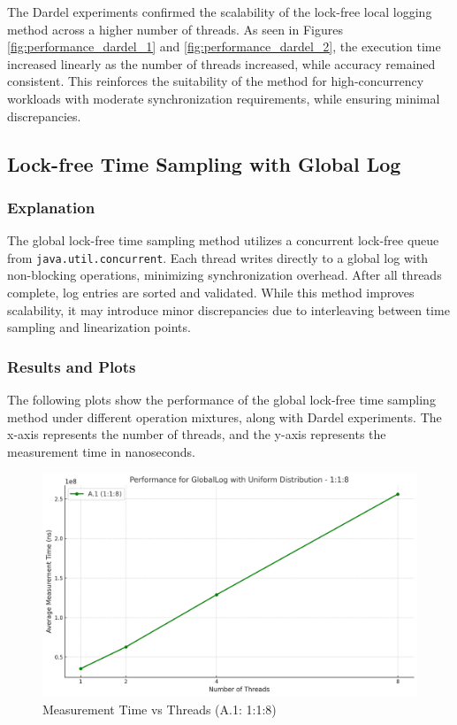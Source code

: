 \documentclass{article}
\begin{document}
The Dardel experiments confirmed the scalability of the lock-free local logging method across a higher number of threads. As seen in Figures \ref{fig:performance_dardel_1} and \ref{fig:performance_dardel_2}, the execution time increased linearly as the number of threads increased, while accuracy remained consistent. This reinforces the suitability of the method for high-concurrency workloads with moderate synchronization requirements, while ensuring minimal discrepancies.


\newpage
\subsection{Lock-free Time Sampling with Global Log}

\subsubsection{Explanation}
The global lock-free time sampling method utilizes a concurrent lock-free queue from \texttt{java.util.concurrent}. Each thread writes directly to a global log with non-blocking operations, minimizing synchronization overhead. After all threads complete, log entries are sorted and validated. While this method improves scalability, it may introduce minor discrepancies due to interleaving between time sampling and linearization points.

\subsubsection{Results and Plots}
The following plots show the performance of the global lock-free time sampling method under different operation mixtures, along with Dardel experiments. The x-axis represents the number of threads, and the y-axis represents the measurement time in nanoseconds.

\begin{figure}[H]
    \centering
    \includegraphics[width=\textwidth]{LaTex/images/Lab 3 2.5.2.1.png}
    \caption{Measurement Time vs Threads (A.1: 1:1:8)}
    \label{fig:global-log-1-1-8}
\end{figure}
\end{document}
